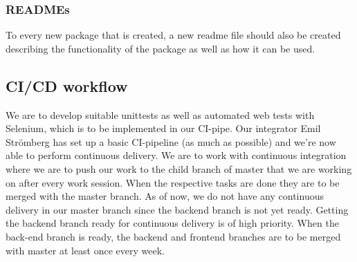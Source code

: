 \subsubsection{READMEs}
To every new package that is created, a new readme file should also be created describing the functionality of the package as well as how it can be used. 



\subsection{CI/CD workflow}
We are to develop suitable unittests as well as automated web tests with Selenium, which is to be implemented in our CI-pipe. Our integrator Emil Strömberg has set up a basic CI-pipeline (as much as possible) and we're now able to perform continuous delivery. We are to work with continuous integration where we are to push our work to the child branch of master that we are working on after every work session. When the respective tasks are done they are to be merged with the master branch. As of now, we do not have any continuous delivery in our master branch since the backend branch is not yet ready. Getting the backend branch ready for continuous delivery is of high priority. When the back-end branch is ready, the backend and frontend branches are to be merged with master at least once every week. 

